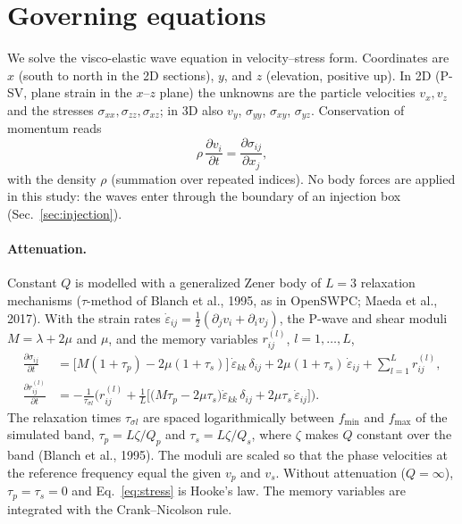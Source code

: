 
\section{Governing equations}\label{sec:equations}

We solve the visco-elastic wave equation in velocity--stress form. Coordinates are $x$ (south to north in the 2D
sections), $y$, and $z$ (elevation, positive up). In 2D (P-SV, plane strain in the $x$--$z$ plane) the unknowns are the
particle velocities $v_x, v_z$ and the stresses $\sigma_{xx}, \sigma_{zz}, \sigma_{xz}$; in 3D also $v_y$, $\sigma_{yy}$,
$\sigma_{xy}$, $\sigma_{yz}$. Conservation of momentum reads
\begin{equation}
  \rho\,\frac{\partial v_i}{\partial t} = \frac{\partial \sigma_{ij}}{\partial x_j},
  \label{eq:momentum}
\end{equation}
with the density $\rho$ (summation over repeated indices). No body forces are applied in this study: the waves enter
through the boundary of an injection box (Sec.~\ref{sec:injection}).

\paragraph{Attenuation.} Constant $Q$ is modelled with a generalized Zener body of $L = 3$ relaxation mechanisms
($\tau$-method of Blanch et al., 1995, as in OpenSWPC; Maeda et al., 2017). With the strain rates
$\dot\varepsilon_{ij} = \tfrac12(\partial_j v_i + \partial_i v_j)$, the P-wave and shear moduli $M = \lambda + 2\mu$ and
$\mu$, and the memory variables $r^{(l)}_{ij}$, $l = 1,\dots,L$,
\begin{align}
  \frac{\partial \sigma_{ij}}{\partial t} &=
     \big[M(1+\tau_p) - 2\mu(1+\tau_s)\big]\,\dot\varepsilon_{kk}\,\delta_{ij}
     + 2\mu(1+\tau_s)\,\dot\varepsilon_{ij} + \sum_{l=1}^{L} r^{(l)}_{ij},
  \label{eq:stress}\\
  \frac{\partial r^{(l)}_{ij}}{\partial t} &= -\frac{1}{\tau_{\sigma l}}\Big( r^{(l)}_{ij}
     + \frac{1}{L}\Big[\big(M\tau_p - 2\mu\tau_s\big)\dot\varepsilon_{kk}\,\delta_{ij} + 2\mu\tau_s\,\dot\varepsilon_{ij}\Big]\Big).
  \label{eq:memory}
\end{align}
The relaxation times $\tau_{\sigma l}$ are spaced logarithmically between $f_{\min}$ and $f_{\max}$ of the simulated band,
$\tau_p = L\zeta/Q_p$ and $\tau_s = L\zeta/Q_s$, where $\zeta$ makes $Q$ constant over the band (Blanch et al., 1995). The
moduli are scaled so that the phase velocities at the reference frequency equal the given $v_p$ and $v_s$. Without
attenuation ($Q = \infty$), $\tau_p = \tau_s = 0$ and Eq.~\eqref{eq:stress} is Hooke's law. The memory variables are
integrated with the Crank--Nicolson rule.

